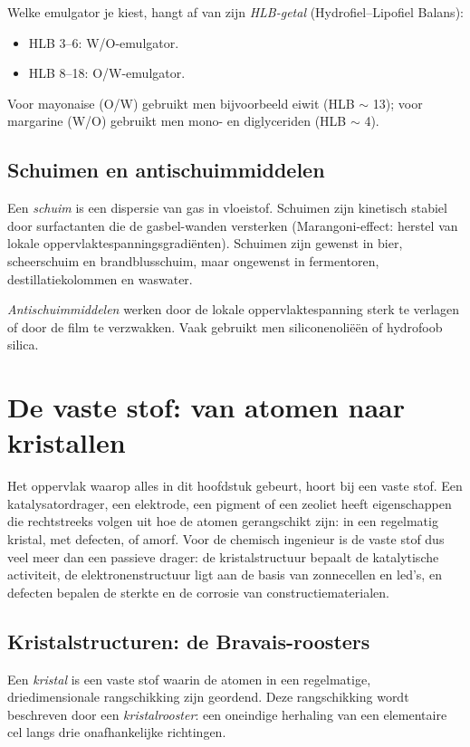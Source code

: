 Welke emulgator je kiest, hangt af van zijn \emph{HLB-getal} (Hydrofiel--Lipofiel Balans):
\begin{itemize}
\item HLB 3--6: W/O-emulgator.
\item HLB 8--18: O/W-emulgator.
\end{itemize}
Voor mayonaise (O/W) gebruikt men bijvoorbeeld eiwit (HLB $\sim$ 13); voor margarine (W/O) gebruikt men mono- en diglyceriden (HLB $\sim$ 4).

\subsection{Schuimen en antischuimmiddelen}

Een \emph{schuim} is een dispersie van gas in vloeistof. Schuimen zijn kinetisch stabiel door surfactanten die de gasbel-wanden versterken (Marangoni-effect: herstel van lokale oppervlaktespanningsgradi\"enten). Schuimen zijn gewenst in bier, scheerschuim en brandblusschuim, maar ongewenst in fermentoren, destillatiekolommen en waswater.

\emph{Antischuimmiddelen} werken door de lokale oppervlaktespanning sterk te verlagen of door de film te verzwakken. Vaak gebruikt men siliconenoli\"e\"en of hydrofoob silica.

\section{De vaste stof: van atomen naar kristallen}
\label{sec:vaste-stof}

Het oppervlak waarop alles in dit hoofdstuk gebeurt, hoort bij een vaste stof. Een katalysatordrager, een elektrode, een pigment of een zeoliet heeft eigenschappen die rechtstreeks volgen uit hoe de atomen gerangschikt zijn: in een regelmatig kristal, met defecten, of amorf. Voor de chemisch ingenieur is de vaste stof dus veel meer dan een passieve drager: de kristalstructuur bepaalt de katalytische activiteit, de elektronenstructuur ligt aan de basis van zonnecellen en led's, en defecten bepalen de sterkte en de corrosie van constructiematerialen.

\subsection{Kristalstructuren: de Bravais-roosters}
\label{sec:bravais}

Een \emph{kristal} is een vaste stof waarin de atomen in een regelmatige, driedimensionale rangschikking zijn geordend. Deze rangschikking wordt beschreven door een \emph{kristalrooster}: een oneindige herhaling van een elementaire cel langs drie onafhankelijke richtingen.

